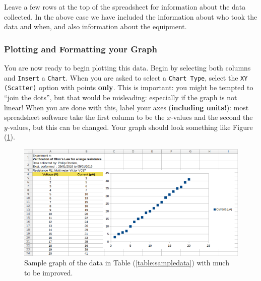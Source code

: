 \begin{tip}
Leave a few rows at the top of the spreadsheet for information about the data collected. In the above case we have included the information about who took the data and when, and also information about the equipment.
\end{tip}

\subsubsection{Plotting and Formatting your Graph}

You are now ready to begin plotting this data. Begin by selecting both columns and \texttt{Insert} a \texttt{Chart}. When you are asked to select a \texttt{Chart Type}, select the \texttt{XY (Scatter)} option with points \textbf{only}. This is important: you might be tempted to ``join the dots'', but that would be misleading: especially if the graph is not linear! When you are done with this, label your axes (\textbf{including units!}): most spreadsheet software take the first column to be the $x$-values and the second the $y$-values, but this can be changed. Your graph should look something like Figure (\ref{fig:samplegraph1}). 


\begin{figure}[!htb]
    \centering
    \includegraphics[scale=0.75]{figs/samplegraph1.png}
    \caption{Sample graph of the data in Table (\ref{table:sampledata}) with much to be improved.}
    \label{fig:samplegraph1}
\end{figure}


